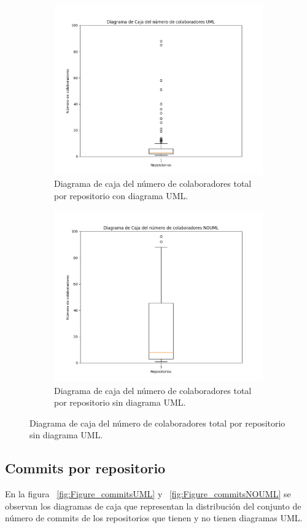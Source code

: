 \documentclass[a4paper, 12pt]{book}
\begin{document}
\begin{figure}
  \centering
  \begin{subfigure}{0.45\linewidth}
    \centering
    \includegraphics[width=9cm, keepaspectratio]{img/Figure_contributorsUML.png}
    \caption{Diagrama de caja del número de colaboradores total por repositorio con diagrama UML. }\label{fig:Figure_contributorsUML}
  \end{subfigure}
  \hfill
    \begin{subfigure}{0.45\linewidth}
      \centering
      \includegraphics[width=9cm, keepaspectratio]{img/Figure_contributorsNOUML.png}
      \caption{Diagrama de caja del número de colaboradores total por repositorio sin diagrama UML.}\label{fig:Figure_contributorsNOUML}
  \end{subfigure}
\end{figure}

\subsection{Commits por repositorio}
\label{sec:Diagrama de caja de los commits por repositorio}
En la figura ~\ref{fig:Figure_commitsUML} y ~\ref{fig:Figure_commitsNOUML} se observan los diagramas de caja que representan la distribución del conjunto de número de commits de los repositorios que tienen y no tienen diagramas UML.
\end{document}
